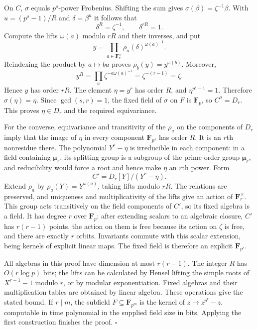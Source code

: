 \documentclass[11pt,a4paper]{article}
\begin{document}
On $C$, $\sigma$ equals $p^s$-power Frobenius. Shifting the sum gives
$\sigma(\beta)=\zeta^{-1}\beta$. With $u=(p^s-1)/R$ and
$\delta=\beta^u$ it follows that
\[
                  \delta^R=\zeta^{-1},\qquad \delta^{rR}=1.
\]
Compute the lifts $\omega(a)$ modulo $rR$ and their inverses, and put
\[
          y=\prod_{a\in\mathbf F_r^\times}
                        \rho_a(\delta)^{\omega(a)^{-1}}.
\]
Reindexing the product by $a\mapsto ba$ proves
$\rho_b(y)=y^{\omega(b)}$. Moreover,
\[
          y^R=\prod_a\zeta^{-a\omega(a)^{-1}}
                   =\zeta^{-(r-1)}=\zeta.
\]
Hence $y$ has order $rR$. The element $\eta=y^r$ has order $R$,
and $\eta^{p^s-1}=1$. Therefore $\sigma(\eta)=\eta$.
Since $\gcd(s,r)=1$, the fixed field of $\sigma$ on $F$ is
$\mathbf F_p$, so $C^\sigma=D_r$. This proves $\eta\in D_r$ and
the required equivariance.

For the converse, equivariance and transitivity of the $\rho_a$ on the
components of $D_r$ imply that the image of $\eta$ in every component
$\mathbf F_{p^s}$ has order $R$. It is an $r$th nonresidue there.
The polynomial $Y^r-\eta$ is irreducible in each component: in a field
containing $\boldsymbol\mu_r$, its splitting group is a subgroup of
the prime-order group $\boldsymbol\mu_r$, and reducibility would force
a root and hence make $\eta$ an $r$th power. Form
\[
                       C'=D_r[Y]/(Y^r-\eta).
\]
Extend $\rho_a$ by $\rho_a(Y)=Y^{\omega(a)}$, taking lifts modulo
$rR$. The relations are preserved, and uniqueness and multiplicativity
of the lifts give an action of $\mathbf F_r^\times$.
This group acts transitively on the field components of $C'$, so its
fixed algebra is a field. It has degree $r$ over $\mathbf F_p$:
after extending scalars to an algebraic closure, $C'$ has $r(r-1)$
points, the action on them is free because its action on $\zeta$ is
free, and there are exactly $r$ orbits. Invariants commute with this
scalar extension, being kernels of explicit linear maps. The fixed
field is therefore an explicit $\mathbf F_{p^r}$.

All algebras in this proof have dimension at most $r(r-1)$.
The integer $R$ has $O(r\log p)$ bits; the lifts can be calculated by
Hensel lifting the simple roots of $X^{r-1}-1$ modulo $r$, or by
modular exponentiation. Fixed algebras and their multiplication tables
are obtained by linear algebra. These operations give the stated bound.
If $r\mid m$, the subfield $F\subseteq\mathbf F_{p^m}$ is the kernel
of $z\mapsto z^{p^r}-z$, computable in time polynomial in the supplied
field size in bits. Applying the first construction finishes the proof.
\hfill$\square$
\end{document}
